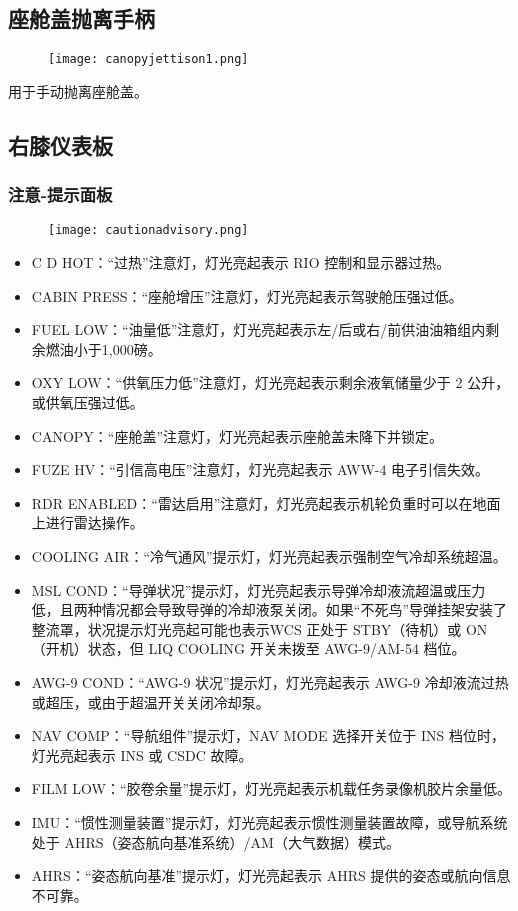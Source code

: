 \subsection{座舱盖抛离手柄}
\begin{figure}[htb]
  \center
  \texttt{[image: canopyjettison1.png]}
\end{figure}
用于手动抛离座舱盖。

\subsection{右膝仪表板}

\subsubsection{注意-提示面板}
\begin{figure}[htb]
  \center
  \texttt{[image: cautionadvisory.png]}
\end{figure}
\begin{itemize}
  \item C D HOT：“过热”注意灯，灯光亮起表示 RIO 控制和显示器过热。
  \item CABIN PRESS：“座舱增压”注意灯，灯光亮起表示驾驶舱压强过低。
  \item FUEL LOW：“油量低”注意灯，灯光亮起表示左/后或右/前供油油箱组内剩余燃油小于1,000磅。
  \item OXY LOW：“供氧压力低”注意灯，灯光亮起表示剩余液氧储量少于 2 公升，或供氧压强过低。
  \item CANOPY：“座舱盖”注意灯，灯光亮起表示座舱盖未降下并锁定。
  \item FUZE HV：“引信高电压”注意灯，灯光亮起表示 AWW-4 电子引信失效。
  \item RDR ENABLED：“雷达启用”注意灯，灯光亮起表示机轮负重时可以在地面上进行雷达操作。
  \item COOLING AIR：“冷气通风”提示灯，灯光亮起表示强制空气冷却系统超温。
  \item MSL COND：“导弹状况”提示灯，灯光亮起表示导弹冷却液流超温或压力低，且两种情况都会导致导弹的冷却液泵关闭。如果“不死鸟”导弹挂架安装了整流罩，状况提示灯光亮起可能也表示WCS 正处于 STBY（待机）或 ON（开机）状态，但 LIQ COOLING 开关未拨至 AWG-9/AM-54 档位。
  \item AWG-9 COND：“AWG-9 状况”提示灯，灯光亮起表示 AWG-9 冷却液流过热或超压，或由于超温开关关闭冷却泵。
  \item NAV COMP：“导航组件”提示灯，NAV MODE 选择开关位于 INS 档位时，灯光亮起表示 INS 或 CSDC 故障。
  \item FILM LOW：“胶卷余量”提示灯，灯光亮起表示机载任务录像机胶片余量低。
  \item IMU：“惯性测量装置”提示灯，灯光亮起表示惯性测量装置故障，或导航系统处于 AHRS（姿态航向基准系统）/AM（大气数据）模式。
  \item AHRS：“姿态航向基准”提示灯，灯光亮起表示 AHRS 提供的姿态或航向信息不可靠。
\end{itemize}

